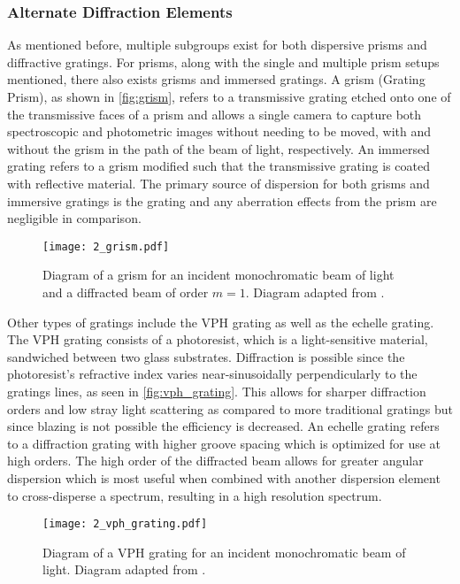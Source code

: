 \subsubsection{Alternate Diffraction Elements}

As mentioned before, multiple subgroups exist for both dispersive prisms and diffractive gratings. For prisms, along with the single and multiple prism setups mentioned, there also exists grisms and immersed gratings. A grism (Grating Prism), as shown in \autoref{fig:grism}, refers to a transmissive grating etched onto one of the transmissive faces of a prism and allows a single camera to capture both spectroscopic and photometric images without needing to be moved, with and without the grism in the path of the beam of light, respectively. An immersed grating refers to a grism modified such that the transmissive grating is coated with reflective material. The primary source of dispersion for both grisms and immersive gratings is the grating and any aberration effects from the prism are negligible in comparison.

\begin{figure}[t]
    \centering
    \texttt{[image: 2\_grism.pdf]}
    \caption{Diagram of a grism for an incident monochromatic beam of light and a diffracted beam of order $m = 1$. Diagram adapted from \cite{BirneyObsAstro}.}
    \label{fig:grism}
\end{figure}

Other types of gratings include the \gls{VPH} grating as well as the echelle grating. The \gls{VPH} grating consists of a photoresist, which is a light-sensitive material, sandwiched between two glass substrates. Diffraction is possible since the photoresist's refractive index varies near-sinusoidally perpendicularly to the gratings lines, as seen in \autoref{fig:vph_grating}. This allows for sharper diffraction orders and low stray light scattering as compared to more traditional gratings but since blazing is not possible the efficiency is decreased. An echelle grating refers to a diffraction grating with higher groove spacing which is optimized for use at high orders. The high order of the diffracted beam allows for greater angular dispersion which is most useful when combined with another dispersion element to cross-disperse a spectrum, resulting in a high resolution spectrum.

\begin{figure}[t]
    \centering
    \texttt{[image: 2\_vph\_grating.pdf]}
    \caption{Diagram of a \gls{VPH} grating for an incident monochromatic beam of light. Diagram adapted from \cite{BirneyObsAstro}.}
    \label{fig:vph_grating}
\end{figure}

